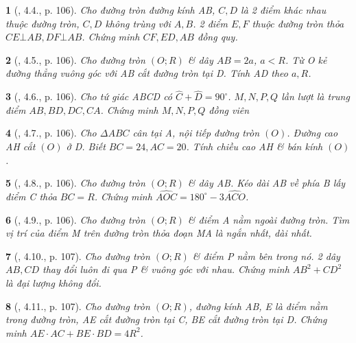 \documentclass{article}
\newtheorem{baitoan}{}
\begin{document}
\begin{baitoan}[\cite{Binh_boi_duong_Toan_9_tap_1}, 4.4., p. 106]
	Cho đường tròn đường kính AB, $C,D$ là 2 điểm khác nhau thuộc đường tròn, $C,D$ không trùng với $A,B$. 2 điểm $E,F$ thuộc đường tròn thỏa $CE\bot AB,DF\bot AB$. Chứng minh $CF,ED,AB$ đồng quy.
\end{baitoan}

\begin{baitoan}[\cite{Binh_boi_duong_Toan_9_tap_1}, 4.5., p. 106]
	Cho đường tròn $(O;R)$ \& dây $AB = 2a$, $a < R$. Từ O kẻ đường thẳng vuông góc với AB cắt đường tròn tại D. Tính AD theo $a,R$.
\end{baitoan}

\begin{baitoan}[\cite{Binh_boi_duong_Toan_9_tap_1}, 4.6., p. 106]
	Cho tứ giác ABCD có $\widehat{C} + \widehat{D} = 90^\circ$. $M,N,P,Q$ lần lượt là trung điểm $AB,BD,DC,CA$. Chứng minh $M,N,P,Q$ đồng viên
\end{baitoan}

\begin{baitoan}[\cite{Binh_boi_duong_Toan_9_tap_1}, 4.7., p. 106]
	Cho $\Delta ABC$ cân tại A, nội tiếp đường tròn $(O)$. Đường cao AH cắt $(O)$ ở D. Biết $BC = 24,AC = 20$. Tính chiều cao AH \& bán kính $(O)$.
\end{baitoan}

\begin{baitoan}[\cite{Binh_boi_duong_Toan_9_tap_1}, 4.8., p. 106]
	Cho đường tròn $(O;R)$ \& dây AB. Kéo dài AB về phía B lấy điểm C thỏa $BC = R$. Chứng minh $\widehat{AOC} = 180^\circ - 3\widehat{ACO}$.
\end{baitoan}

\begin{baitoan}[\cite{Binh_boi_duong_Toan_9_tap_1}, 4.9., p. 106]
	Cho đường tròn $(O;R)$ \& điểm A nằm ngoài đường tròn. Tìm vị trí của điểm M trên đường tròn thỏa đoạn MA là ngắn nhất, dài nhất.
\end{baitoan}

\begin{baitoan}[\cite{Binh_boi_duong_Toan_9_tap_1}, 4.10., p. 107]
	Cho đường tròn $(O;R)$ \& điểm P nằm bên trong nó. 2 dây $AB,CD$ thay đổi luôn đi qua P \& vuông góc với nhau. Chứng minh $AB^2 + CD^2$ là đại lượng không đổi.
\end{baitoan}

\begin{baitoan}[\cite{Binh_boi_duong_Toan_9_tap_1}, 4.11., p. 107]
	Cho đường tròn $(O;R)$, đường kính AB, E là điểm nằm trong đường tròn, AE cắt đường tròn tại C, BE cắt đường tròn tại D. Chứng minh $AE\cdot AC + BE\cdot BD = 4R^2$.
\end{baitoan}
\end{document}
